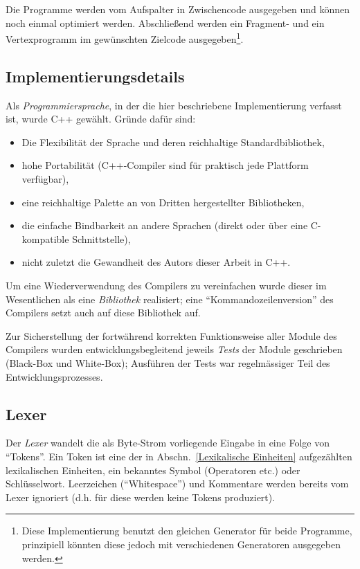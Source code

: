 \documentclass[twoside,a4paper,fleqn,12pt]{article}
\begin{document}
Die Programme werden vom Aufspalter in Zwischencode ausgegeben und können noch einmal optimiert werden. %
Abschließend werden ein Fragment- und ein Vertexprogramm im gewünschten Zielcode ausgegeben\footnote{Diese Implementierung benutzt den
gleichen Generator für beide Programme, prinzipiell könnten diese jedoch mit verschiedenen Generatoren ausgegeben werden.}.

\subsection{Implementierungsdetails}

Als \emph{Programmiersprache}, in der die hier beschriebene Implementierung verfasst ist, wurde C++ gewählt.
Gründe dafür sind:
\begin{itemize}
\item Die Flexibilität der Sprache und deren reichhaltige Standardbibliothek,
\item hohe Portabilität (C++-Compiler sind für praktisch jede Plattform verfügbar),
\item eine reichhaltige Palette an von Dritten hergestellter Bibliotheken,
\item die einfache Bindbarkeit an andere Sprachen (direkt oder über eine C-kompatible Schnittstelle),
\item nicht zuletzt die Gewandheit des Autors dieser Arbeit in C++.
\end{itemize}
 
Um eine Wiederverwendung des Compilers zu vereinfachen wurde dieser im Wesentlichen als eine \emph{Bibliothek} realisiert;
eine "`Kommandozeilenversion"' des Compilers setzt auch auf diese Bibliothek auf.
 
Zur Sicherstellung der fortwährend korrekten Funktionsweise aller Module des Compilers wurden entwicklungsbegleitend 
jeweils \emph{Tests} der Module geschrieben (Black-Box und White-Box); Ausführen der Tests war regelmässiger Teil des Entwicklungsprozesses.
 
\subsection{Lexer}

Der \emph{Lexer} wandelt die als Byte-Strom vorliegende Eingabe in eine Folge von "`Tokens"'.
Ein Token ist eine der in Abschn.~\ref{Lexikalische Einheiten} aufgezählten lexikalischen Einheiten, ein bekanntes Symbol (Operatoren etc.) oder Schlüsselwort. 
Leerzeichen (``Whitespace'') und Kommentare werden bereits vom Lexer ignoriert (d.h. für diese werden keine Tokens produziert).
\end{document}
